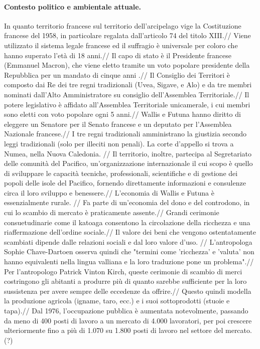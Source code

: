 \documentclass[fleqn,10pt]{SelfArx} %
\begin{document}
\paragraph*{Contesto politico e ambientale attuale.}
In quanto territorio francese sul territorio dell'arcipelago vige la Costituzione francese del 1958, in particolare regalata dall'articolo 74 del titolo XIII.//
Viene utilizzato il sistema legale francese ed il suffragio è universale per coloro che hanno superato l'età di 18 anni.// 
Il capo di stato è il Presidente francese (Emmanuel Macron), che viene eletto tramite un voto popolare presidente della Repubblica per un mandato di cinque anni .//
Il Consiglio dei Territori è composto dai Re dei tre regni tradizionali (Uvea, Sigave, e Alo) e da tre membri nominati dall'Alto Amministratore su consiglio dell'Assemblea Territoriale.//
Il potere legislativo è affidato all'Assemblea Territoriale unicamerale, i cui membri sono eletti con voto popolare ogni 5 anni.//
Wallis e Futuna hanno diritto di eleggere un Senatore per il Senato francese e un deputato per l'Assemblea Nazionale francese.// 
I tre regni tradizionali amministrano la giustizia secondo leggi tradizionali (solo per illeciti non penali). La corte d'appello si trova a Numea, nella Nuova Caledonia. //
Il territorio, inoltre, partecipa al Segretariato delle comunità del Pacifico, un'organizzazione internazionale il cui scopo è quello di sviluppare le capacità tecniche, professionali, scientifiche e di gestione dei popoli delle isole del Pacifico, fornendo direttamente informazioni e consulenze circa il loro sviluppo e benessere.//
L'economia di Wallis e Futuna è essenzialmente rurale. //
Fa parte di un'economia del dono e del controdono, in cui lo scambio di mercato è praticamente assente.//
Grandi cerimonie consuetudinarie come il katoaga consentono la circolazione della ricchezza e una riaffermazione dell'ordine sociale.//
Il valore dei beni che vengono ostentatamente scambiati dipende dalle relazioni sociali e dal loro valore d'uso. //
L'antropologa Sophie Chave-Dartoen osserva quindi che "termini come 'ricchezza' e 'valuta' non hanno equivalenti nella lingua valliana e la loro traduzione pone un problema".//
Per l'antropologo Patrick Vinton Kirch, queste cerimonie di scambio di merci costringono gli abitanti a produrre più di quanto sarebbe sufficiente per la loro sussistenza per avere sempre delle eccedenze da offrire.//
Questo quindi modella la produzione agricola (igname, taro, ecc.) e i suoi sottoprodotti (stuoie e tapa).//
Dal 1976, l'occupazione pubblica è aumentata notevolmente, passando da meno di 400 posti di lavoro a un  mercato di 4.000 lavoratori, per poi crescere ulteriormente fino a più di 1.070 su 1.800 posti di lavoro nel settore del mercato.(?) 
\end{document}
